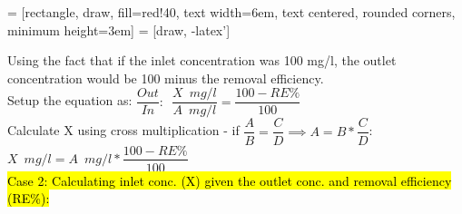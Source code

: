  = [rectangle, draw, fill=red!40, 
    text width=6em, text centered, rounded corners, minimum height=3em]
 = [draw, -latex']
\begin{figure}[!h]
\centering
{}
\end{figure}
Using the fact that if the inlet concentration was 100 mg/l, the outlet concentration would be 100 minus the removal efficiency.\\
Setup the equation as:  $\dfrac{Out}{In}: \enspace \dfrac{X \enspace mg/l}{A \enspace mg/l}=\dfrac{100-RE\%}{100}$\\
Calculate X using cross multiplication - if $\dfrac{A}{B}=\dfrac{C}{D} \implies A=B*\dfrac{C}{D}$:\\
$X \enspace mg/l=A \enspace mg/l*\dfrac{100-RE\%}{100}$\\

\hl{Case 2:  Calculating inlet conc. (X) given the outlet conc. and removal efficiency (RE\%):}

